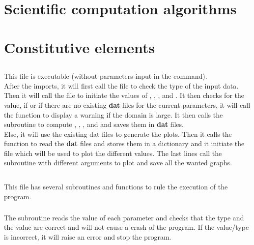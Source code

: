 \section{Scientific computation algorithms}


\section{Constitutive elements}
\subsection{}
This file is executable (without parameters input in the command).\\
After the imports, it will first call the file  to check the
type of the input data.\\
Then it will call the file  to initiate
the values of , , ,  and .
\smallbreak{}
It then checks for the  value, if  or if there are no
existing \textbf{dat} files for the current parameters, it will call
the function  to display a warning if the domain is large.
It then calls the subroutine  to compute ,
, ,  and  and saves them in
\textbf{dat} files.\\
Else, it will use the existing dat files to generate the plots.
\smallbreak{}
Then it calls the function  to read the \textbf{dat} files and
stores them in a dictionary and it initiate the file  which will be
used to plot the different values.
\smallbreak{}
The last lines call the subroutine  with different arguments
to plot and save all the wanted graphs.

\subsection{}
This file has several subroutines and functions to rule the execution of the
program.

\subsubsection{\textcolor{func}{}}
The subroutine \textcolor{func}{} reads the value of each
parameter and checks that the type and the value are correct and will not cause
a crash of the program. If the value/type is incorrect, it will raise an error
and stop the program.

